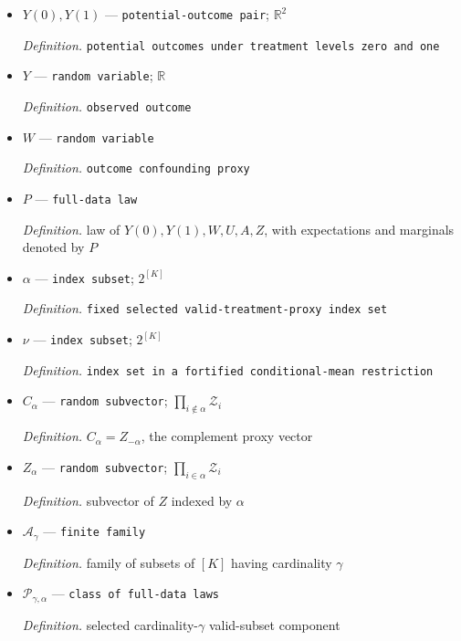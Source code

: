 \documentclass{article}
\begin{document}
\begin{itemize}
  \par\smallskip\noindent\emph{Definition.} \texttt{unmeasured confounder}
  \item \(Y(0),Y(1)\) --- \texttt{potential-\allowbreak{}outcome pair}; \(\mathbb R^2\)
  \par\smallskip\noindent\emph{Definition.} \texttt{potential outcomes under treatment levels zero and one}
  \item \(Y\) --- \texttt{random variable}; \(\mathbb R\)
  \par\smallskip\noindent\emph{Definition.} \texttt{observed outcome}
  \item \(W\) --- \texttt{random variable}
  \par\smallskip\noindent\emph{Definition.} \texttt{outcome confounding proxy}
  \item \(P\) --- \texttt{full-\allowbreak{}data law}
  \par\smallskip\noindent\emph{Definition.} law of \(Y(0),Y(1),W,U,A,Z\), with expectations and marginals denoted by \(P\)
  \item \(\alpha\) --- \texttt{index subset}; \(2^{[K]}\)
  \par\smallskip\noindent\emph{Definition.} \texttt{fixed selected valid-\allowbreak{}treatment-\allowbreak{}proxy index set}
  \item \(\nu\) --- \texttt{index subset}; \(2^{[K]}\)
  \par\smallskip\noindent\emph{Definition.} \texttt{index set in a fortified conditional-\allowbreak{}mean restriction}
  \item \(C_\alpha\) --- \texttt{random subvector}; \(\prod_{i\notin\alpha}\mathcal Z_i\)
  \par\smallskip\noindent\emph{Definition.} \(C_\alpha=Z_{-\alpha}\), the complement proxy vector
  \item \(Z_\alpha\) --- \texttt{random subvector}; \(\prod_{i\in\alpha}\mathcal Z_i\)
  \par\smallskip\noindent\emph{Definition.} subvector of \(Z\) indexed by \(\alpha\)
  \item \(\mathcal A_\gamma\) --- \texttt{finite family}
  \par\smallskip\noindent\emph{Definition.} family of subsets of \([K]\) having cardinality \(\gamma\)
  \item \(\mathcal P_{\gamma,\alpha}\) --- \texttt{class of full-\allowbreak{}data laws}
  \par\smallskip\noindent\emph{Definition.} selected cardinality-\(\gamma\) valid-subset component

\end{itemize}
\end{document}
